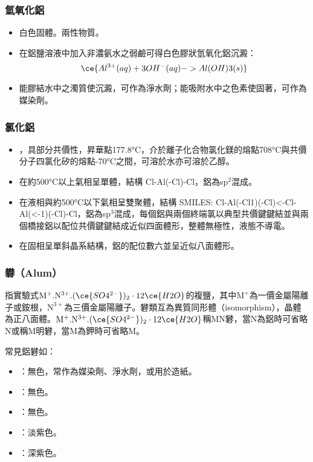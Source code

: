 \documentclass[a4paper,12pt]{report}
\begin{document}
\begin{itemize}
\begin{itemize}
\subsubsection{氫氧化鋁}
\begin{itemize}
\item 白色固體。兩性物質。
\item 在鋁鹽溶液中加入非濃氨水之弱鹼可得白色膠狀氫氧化鋁沉澱：
\[\ce{Al^{3+}(aq) + 3OH^-(aq) -> Al(OH)3(s)}\]
\item 能膠結水中之濁質使沉澱，可作為淨水劑；能吸附水中之色素使固著，可作為媒染劑。
\end{itemize}
\subsubsection{氯化鋁}
\begin{itemize}
\item {}，具部分共價性，昇華點177.8°C，介於離子化合物氯化鎂的熔點708°C與共價分子四氯化矽的熔點-70°C之間，可溶於水亦可溶於乙醇。
\item 在約500°C以上氣相呈單體，結構 Cl-Al(-Cl)-Cl，鋁為sp$^2$混成。
\item 在液相與約500°C以下氣相呈雙聚體，結構 SMILES: Cl-Al(-Cl1)(-Cl)<-Cl-Al(<-1)(-Cl)-Cl，鋁為sp$^3$混成，每個鋁與兩個終端氯以典型共價鍵鍵結並與兩個橋接鋁以配位共價鍵鍵結成近似四面體形，整體無極性，液態不導電。
\item 在固相呈單斜晶系結構，鋁的配位數六並呈近似八面體形。
\end{itemize}
\subsubsection{礬（Alum）}
指實驗式$\mathrm{M}^+.\mathrm{N}^{3+}.(\ce{SO4^{2-}})_2\cdot 12\ce{H2O}$的複鹽，其中$\mathrm{M}^+$為一價金屬陽離子或銨根，$\mathrm{N}^{3+}$為三價金屬陽離子。礬類互為異質同形體（isomorphism），晶體為正八面體。$\mathrm{M}^+.\mathrm{N}^{3+}.(\ce{SO4^{2-}})_2\cdot 12\ce{H2O}$稱$\mathrm{M}\mathrm{N}$礬，當$\mathrm{N}$為鋁時可省略$\mathrm{N}$或稱$\mathrm{M}$明礬，當$\mathrm{M}$為鉀時可省略$\mathrm{M}$。

常見鋁礬如：
\begin{itemize}
\item {}：無色，常作為媒染劑、淨水劑，或用於造紙。
\item {}：無色。
\item {}：無色。
\item {}：淡紫色。
\item {}：深紫色。
\end{itemize}


\end{itemize}
\end{itemize}
\end{document}
